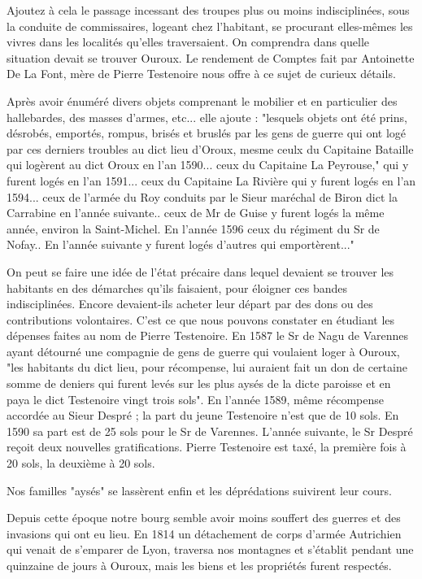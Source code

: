 Ajoutez à cela le passage incessant des troupes plus ou moins indisciplinées, sous la conduite de commissaires, logeant chez l'habitant, se procurant elles-mêmes les vivres dans les localités qu'elles traversaient. On comprendra dans quelle situation devait se trouver Ouroux. Le rendement de Comptes fait par Antoinette De La Font, mère de Pierre Testenoire nous offre à ce sujet de curieux détails.

Après avoir énuméré divers objets comprenant le mobilier et en particulier des hallebardes, des masses d'armes, etc... elle ajoute :
"lesquels objets ont été prins, désrobés, emportés, rompus, brisés et bruslés par les gens de guerre qui ont logé par ces derniers troubles au dict lieu d'Oroux, mesme ceulx du Capitaine Bataille qui logèrent au dict Oroux en l'an 1590... ceux du Capitaine La Peyrouse,"
qui y furent logés en l'an 1591... ceux du Capitaine La Rivière qui y furent logés en l'an 1594... ceux de l'armée du Roy conduits par le Sieur maréchal de Biron dict la Carrabine en l'année suivante.. ceux de Mr de Guise y furent logés la même année, environ la Saint-Michel. En l'année 1596 ceux du régiment du Sr de Nofay.. En l'année suivante y furent logés d'autres qui emportèrent..."

On peut se faire une idée de l'état précaire dans lequel devaient se trouver les habitants en des démarches qu'ils faisaient, pour éloigner ces bandes indisciplinées. Encore devaient-ils acheter leur départ par des dons ou des contributions volontaires. C'est ce que nous pouvons constater en étudiant les dépenses faites au nom de Pierre Testenoire. En 1587 le Sr de Nagu de Varennes ayant détourné une compagnie de gens de guerre qui voulaient loger à Ouroux, "les habitants du dict lieu, pour récompense, lui auraient fait un don de certaine somme de deniers qui furent levés sur les plus aysés de la dicte paroisse et en paya le dict Testenoire vingt trois sols". En l'année 1589, même récompense accordée au Sieur Despré ; la part du jeune Testenoire n'est que de 10 sols. En 1590 sa part est de 25 sols pour le Sr de Varennes. L'année suivante, le Sr Despré reçoit deux nouvelles gratifications. Pierre Testenoire est taxé, la première fois à 20 sols, la deuxième à 20 sols.

Nos familles "aysés" se lassèrent enfin et les déprédations suivirent leur cours.

Depuis cette époque notre bourg semble avoir moins souffert des guerres et des invasions qui ont eu lieu. En 1814 un détachement de corps d'armée Autrichien qui venait de s'emparer de Lyon, traversa nos montagnes et s'établit pendant une quinzaine de jours à Ouroux, mais les biens et les propriétés furent respectés.

